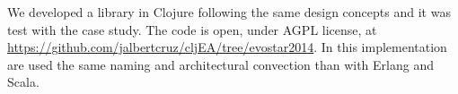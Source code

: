 
We developed a library in Clojure following the same design concepts and it was test with the case study. The code is open, under AGPL license, at \url{https://github.com/jalbertcruz/cljEA/tree/evostar2014}. In this implementation are used the same naming and architectural convection than with Erlang and Scala.
